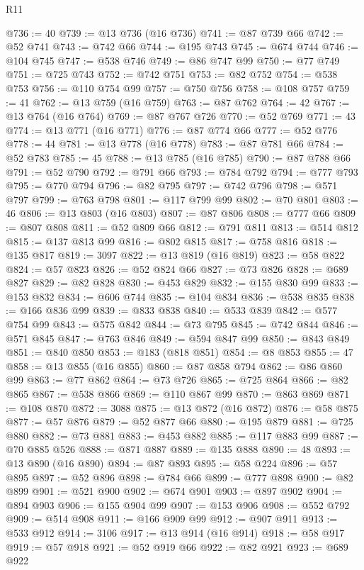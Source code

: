 \begin{lexlean}{R11}
\begin{coremodule}
@736 := 40
@739 := @13 @736 (@16 @736)
@741 := @87 @739 @66
@742 := @52 @741
@743 := @742 @66
@744 := @195 @743
@745 := @674 @744
@746 := @104 @745
@747 := @538 @746
@749 := @86 @747 @99
@750 := @77 @749
@751 := @725 @743
@752 := @742 @751
@753 := @82 @752
@754 := @538 @753
@756 := @110 @754 @99
@757 := @750 @756
@758 := @108 @757
@759 := 41
@762 := @13 @759 (@16 @759)
@763 := @87 @762
@764 := 42
@767 := @13 @764 (@16 @764)
@769 := @87 @767 @726
@770 := @52 @769
@771 := 43
@774 := @13 @771 (@16 @771)
@776 := @87 @774 @66
@777 := @52 @776
@778 := 44
@781 := @13 @778 (@16 @778)
@783 := @87 @781 @66
@784 := @52 @783
@785 := 45
@788 := @13 @785 (@16 @785)
@790 := @87 @788 @66
@791 := @52 @790
@792 := @791 @66
@793 := @784 @792
@794 := @777 @793
@795 := @770 @794
@796 := @82 @795
@797 := @742 @796
@798 := @571 @797
@799 := @763 @798
@801 := @117 @799 @99
@802 := @70 @801
@803 := 46
@806 := @13 @803 (@16 @803)
@807 := @87 @806
@808 := @777 @66
@809 := @807 @808
@811 := @52 @809 @66
@812 := @791 @811
@813 := @514 @812
@815 := @137 @813 @99
@816 := @802 @815
@817 := @758 @816
@818 := @135 @817
@819 := 3097
@822 := @13 @819 (@16 @819)
@823 := @58 @822
@824 := @57 @823
@826 := @52 @824 @66
@827 := @73 @826
@828 := @689 @827
@829 := @82 @828
@830 := @453 @829
@832 := @155 @830 @99
@833 := @153 @832
@834 := @606 @744
@835 := @104 @834
@836 := @538 @835
@838 := @166 @836 @99
@839 := @833 @838
@840 := @533 @839
@842 := @577 @754 @99
@843 := @575 @842
@844 := @73 @795
@845 := @742 @844
@846 := @571 @845
@847 := @763 @846
@849 := @594 @847 @99
@850 := @843 @849
@851 := @840 @850
@853 := @183 (@818 @851)
@854 := @8 @853
@855 := 47
@858 := @13 @855 (@16 @855)
@860 := @87 @858 @794
@862 := @86 @860 @99
@863 := @77 @862
@864 := @73 @726
@865 := @725 @864
@866 := @82 @865
@867 := @538 @866
@869 := @110 @867 @99
@870 := @863 @869
@871 := @108 @870
@872 := 3088
@875 := @13 @872 (@16 @872)
@876 := @58 @875
@877 := @57 @876
@879 := @52 @877 @66
@880 := @195 @879
@881 := @725 @880
@882 := @73 @881
@883 := @453 @882
@885 := @117 @883 @99
@887 := @70 @885 @526
@888 := @871 @887
@889 := @135 @888
@890 := 48
@893 := @13 @890 (@16 @890)
@894 := @87 @893
@895 := @58 @224
@896 := @57 @895
@897 := @52 @896
@898 := @784 @66
@899 := @777 @898
@900 := @82 @899
@901 := @521 @900
@902 := @674 @901
@903 := @897 @902
@904 := @894 @903
@906 := @155 @904 @99
@907 := @153 @906
@908 := @552 @792
@909 := @514 @908
@911 := @166 @909 @99
@912 := @907 @911
@913 := @533 @912
@914 := 3106
@917 := @13 @914 (@16 @914)
@918 := @58 @917
@919 := @57 @918
@921 := @52 @919 @66
@922 := @82 @921
@923 := @689 @922

\end{coremodule}
\end{lexlean}
